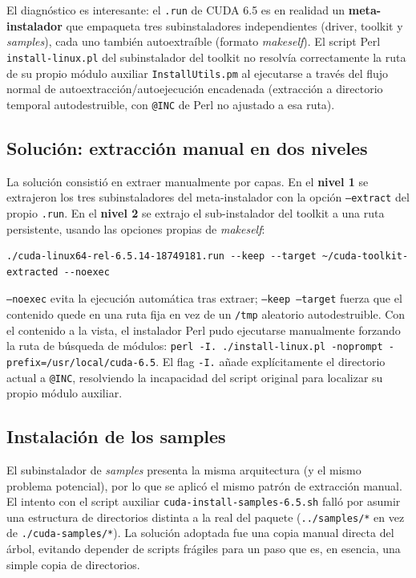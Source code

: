 El diagnóstico es interesante: el \texttt{.run} de CUDA 6.5 es en realidad un \textbf{meta-instalador} que empaqueta tres subinstaladores independientes (driver, toolkit y \textit{samples}), cada uno también autoextraíble (formato \textit{makeself}). El script Perl \texttt{install-linux.pl} del subinstalador del toolkit no resolvía correctamente la ruta de su propio módulo auxiliar \texttt{InstallUtils.pm} al ejecutarse a través del flujo normal de autoextracción/autoejecución encadenada (extracción a directorio temporal autodestruible, con \texttt{@INC} de Perl no ajustado a esa ruta).

\subsection{Solución: extracción manual en dos niveles}

La solución consistió en extraer manualmente por capas. En el \textbf{nivel 1} se extrajeron los tres subinstaladores del meta-instalador con la opción \texttt{--extract} del propio \texttt{.run}. En el \textbf{nivel 2} se extrajo el sub-instalador del toolkit a una ruta persistente, usando las opciones propias de \textit{makeself}:

\begin{lstlisting}[style=bash]
./cuda-linux64-rel-6.5.14-18749181.run --keep --target ~/cuda-toolkit-extracted --noexec
\end{lstlisting}

\texttt{--noexec} evita la ejecución automática tras extraer; \texttt{--keep --target} fuerza que el contenido quede en una ruta fija en vez de un \texttt{/tmp} aleatorio autodestruible. Con el contenido a la vista, el instalador Perl pudo ejecutarse manualmente forzando la ruta de búsqueda de módulos: \texttt{perl -I. ./install-linux.pl -noprompt -prefix=/usr/local/cuda-6.5}. El flag \texttt{-I.} añade explícitamente el directorio actual a \texttt{@INC}, resolviendo la incapacidad del script original para localizar su propio módulo auxiliar.

\subsection{Instalación de los samples}

El subinstalador de \textit{samples} presenta la misma arquitectura (y el mismo problema potencial), por lo que se aplicó el mismo patrón de extracción manual. El intento con el script auxiliar \texttt{cuda-install-samples-6.5.sh} falló por asumir una estructura de directorios distinta a la real del paquete (\texttt{../samples/*} en vez de \texttt{./cuda-samples/*}). La solución adoptada fue una copia manual directa del árbol, evitando depender de scripts frágiles para un paso que es, en esencia, una simple copia de directorios.


